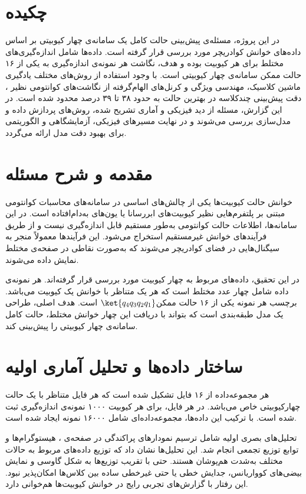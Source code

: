 
\section*{چکیده}
در این پروژه، مسئله‌ی پیش‌بینی حالت کامل یک سامانه‌ی چهار کیوبیتی بر اساس داده‌های خوانش کوادریچر مورد بررسی قرار گرفته است. داده‌ها شامل اندازه‌گیری‌های مختلط برای هر کیوبیت بوده و هدف، نگاشت هر نمونه‌ی اندازه‌گیری به یکی از ۱۶ حالت ممکن سامانه‌ی چهار کیوبیتی است. با وجود استفاده از روش‌های مختلف یادگیری ماشین کلاسیک، مهندسی ویژگی و کرنل‌های الهام‌گرفته از نگاشت‌های کوانتومی نظیر ، دقت پیش‌بینی چندکلاسه در بهترین حالت به حدود ۳۸ تا ۳۹ درصد محدود شده است. در این گزارش، مسئله از دید فیزیکی و آماری تشریح شده، روش‌های پردازش داده و مدل‌سازی بررسی می‌شوند و در نهایت مسیرهای فیزیکی، آزمایشگاهی و الگوریتمی برای بهبود دقت مدل ارائه می‌گردد.

\section{مقدمه و شرح مسئله}
خوانش حالت کیوبیت‌ها یکی از چالش‌های اساسی در سامانه‌های محاسبات کوانتومی مبتنی بر پلتفرم‌هایی نظیر کیوبیت‌های ابررسانا یا یون‌های به‌دام‌افتاده است. در این سامانه‌ها، اطلاعات حالت کوانتومی به‌طور مستقیم قابل اندازه‌گیری نیست و از طریق فرآیندهای خوانش غیرمستقیم استخراج می‌شود. این فرآیندها معمولاً منجر به سیگنال‌هایی در فضای کوادریچر می‌شوند که به‌صورت نقاطی در صفحه‌ی مختلط  نمایش داده می‌شوند.

در این تحقیق، داده‌های مربوط به چهار کیوبیت مورد بررسی قرار گرفته‌اند. هر نمونه‌ی داده شامل چهار عدد مختلط است که هر یک متناظر با خوانش یک کیوبیت می‌باشد. برچسب هر نمونه یکی از ۱۶ حالت ممکن$ \ket{q_4 q_3 q_2 q_1}$ است. هدف اصلی، طراحی یک مدل طبقه‌بندی است که بتواند با دریافت این چهار خوانش مختلط، حالت کامل سامانه‌ی چهار کیوبیتی را پیش‌بینی کند.


\section{ساختار داده‌ها و تحلیل آماری اولیه}
هر مجموعه‌داده از ۱۶ فایل تشکیل شده است که هر فایل متناظر با یک حالت چهارکیوبیتی خاص می‌باشد. در هر فایل، برای هر کیوبیت ۱۰۰۰ نمونه‌ی اندازه‌گیری ثبت شده است. با ترکیب این داده‌ها، مجموعه‌داده‌ای شامل ۱۶۰۰۰ نمونه ایجاد شده است.

تحلیل‌های بصری اولیه شامل ترسیم نمودارهای پراکندگی در صفحه‌ی ، هیستوگرام‌ها و توابع توزیع تجمعی انجام شد. این تحلیل‌ها نشان داد که توزیع داده‌های مربوط به حالات مختلف به‌شدت هم‌پوشان هستند. حتی با تقریب توزیع‌ها به شکل گاوسی و نمایش بیضی‌های کوواریانس، جدایش خطی یا حتی غیرخطی ساده بین کلاس‌ها امکان‌پذیر نبود. این رفتار با گزارش‌های تجربی رایج در خوانش کیوبیت‌ها هم‌خوانی دارد.

